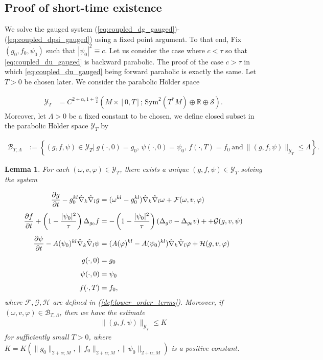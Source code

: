 \documentclass{amsart}
\newtheorem{lemma}[theorem]{Lemma}
\theoremstyle{definition}
\theoremstyle{remark}
\numberwithin{equation}{section}
\newcommand{\R}{\mathbb{R}}
\newcommand{\D}[2]{\frac{\partial #1}{\partial #2}}
\begin{document}
\medskip

\subsection{Proof of short-time existence}

We solve the gauged system (\ref{eq:coupled_dg_gauged})-(\ref{eq:coupled_dpsi_gauged}) using a fixed point argument. To that end, Fix $(g_0, f_0, \psi_0)$ such that $|\psi_0|^2 \equiv c$. Let us consider the case where $c<\tau$ so that \eqref{eq:coupled_du_gauged} is backward parabolic. The proof of the case $c>\tau$ in which \eqref{eq:coupled_du_gauged} being forward parabolic is exactly the same. Let $T>0$ be chosen later. We consider the parabolic H\"older space
	
	\begin{align*}
		\mathcal{Y}_T &= C^{2+\alpha,1+\frac{\alpha}{2}}(M\times [0,T];\,\text{Sym}^2(T^*M)\oplus\R \oplus\mathcal{S}).
	\end{align*}
Moreover, let $\Lambda>0$ be a fixed constant to be chosen, we define closed subset in the parabolic H\"older space $\mathcal{Y}_T$ by
	
	\begin{align*}
		\mathcal{B}_{T,\Lambda} &:= \left\{ (g,f,\psi)\in \mathcal{Y}_T|\ g(\cdot,0)=g_0,\, \psi(\cdot,0)=\psi_0,\, f(\cdot,T) = f_0\ \text{and}\ \|(g,f,\psi)\|_{\mathcal{Y}_T}\leq \Lambda \right\}.
	\end{align*}

\begin{lemma}\label{lem:existence_decoupled_system}
	For each $(\omega, v,\varphi)\in \mathcal{Y}_T$, there exists a unique $(g,f,\psi)\in \mathcal{Y}_T$ solving the system
	
	\begin{align}
			\label{eq:decoupled_dg_gauged}\D{g}{t} - g_0^{kl}\hat{\nabla}_k\hat{\nabla}_lg & = (\omega^{kl}-g_0^{kl})\hat{\nabla}_k\hat{\nabla}_l\omega + \mathcal{F}(\omega, v,\varphi)\\[1ex]
			\label{eq:decoupled_du_gauged}\D{f}{t}+ \left( 1 - \frac{|\psi_0|^2}{\tau}\right)\Delta_{g_0} f & = -\left( 1 - \frac{|\psi_0|^2}{\tau}\right)(\Delta_{g} v - \Delta_{g_0} v)+    + \mathcal{G}(g, v,\psi)\\[1ex]
			\label{eq:decoupled_dpsi_gauged}\D{\psi}{t} - A(\psi_0)^{kl}\hat{\nabla}_k\hat{\nabla}_l\psi & = (A(\varphi)^{kl} - A(\psi_0)^{kl})\hat{\nabla}_k\hat{\nabla}_l\varphi + \mathcal{H}(g, v,\varphi)\\[1ex]
			\notag g(\cdot,0) &= g_0\\[1ex]
			\notag \psi(\cdot,0) &= \psi_0\\[1ex]
			\notag f(\cdot,T) &= f_0,
	\end{align}
where $\mathcal{F},\mathcal{G},\mathcal{H}$ are defined in (\ref{def:lower_order_terms}).  Moreover, if $(\omega, v,\varphi)\in \mathcal{B}_{T,\Lambda}$, then we have the estimate
\begin{align*}
	\|(g,f,\psi)\|_{\mathcal{Y}_T} \leq K
\end{align*}
for sufficiently small $T>0$, where $K = K(\|g_0\|_{2+\alpha;M}, \|f_0\|_{2+\alpha;M},\|\psi_0\|_{2+\alpha;M})$ is a positive constant. 
\end{lemma}
\end{document}
